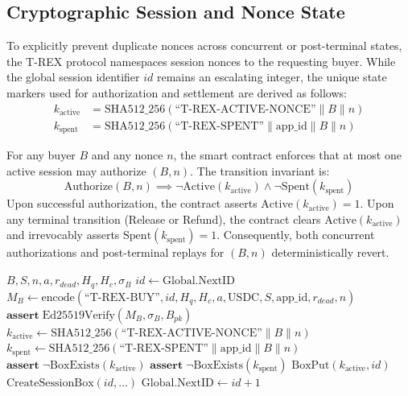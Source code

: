 
\subsection{Cryptographic Session and Nonce State}
To explicitly prevent duplicate nonces across concurrent or post-terminal states, the T-REX protocol namespaces session nonces to the requesting buyer. While the global session identifier $id$ remains an escalating integer, the unique state markers used for authorization and settlement are derived as follows:
\begin{align}
k_{\text{active}} &= \mathrm{SHA512\_256}(\text{``T-REX-ACTIVE-NONCE''} \parallel B \parallel n) \\
k_{\text{spent}} &= \mathrm{SHA512\_256}(\text{``T-REX-SPENT''} \parallel \text{app\_id} \parallel B \parallel n)
\end{align}

\begin{theorem}
For any buyer $B$ and any nonce $n$, the smart contract enforces that at most one active session may authorize $(B, n)$. The transition invariant is:
\[
\mathrm{Authorize}(B, n) \implies \neg \mathrm{Active}(k_{\text{active}}) \land \neg \mathrm{Spent}(k_{\text{spent}})
\]
Upon successful authorization, the contract asserts $\mathrm{Active}(k_{\text{active}}) = 1$. Upon any terminal transition (Release or Refund), the contract clears $\mathrm{Active}(k_{\text{active}})$ and irrevocably asserts $\mathrm{Spent}(k_{\text{spent}}) = 1$. Consequently, both concurrent authorizations and post-terminal replays for $(B, n)$ deterministically revert.
\end{theorem}

\begin{algorithm}[h]
\caption{T-REX Nonce-Enforced Authorization}
\label{alg:authorize}
\begin{algorithmic}[1]
\Require $B, S, n, a, r_{dead}, H_q, H_c, \sigma_B$
\State $id \gets \mathrm{Global.NextID}$
\State $M_B \gets \mathrm{encode}(\text{``T-REX-BUY''}, id, H_q, H_c, a, \text{USDC}, S, \text{app\_id}, r_{dead}, n)$
\State $\mathbf{assert}\; \mathrm{Ed25519Verify}(M_B, \sigma_B, B_{pk})$
\State $k_{\text{active}} \gets \mathrm{SHA512\_256}(\text{``T-REX-ACTIVE-NONCE''} \parallel B \parallel n)$
\State $k_{\text{spent}} \gets \mathrm{SHA512\_256}(\text{``T-REX-SPENT''} \parallel \text{app\_id} \parallel B \parallel n)$
\State $\mathbf{assert}\; \neg \mathrm{BoxExists}(k_{\text{active}})$ 
\State $\mathbf{assert}\; \neg \mathrm{BoxExists}(k_{\text{spent}})$ 
\State $\mathrm{BoxPut}(k_{\text{active}}, id)$
\State $\mathrm{CreateSessionBox}(id, \dots)$
\State $\mathrm{Global.NextID} \gets id + 1$
\end{algorithmic}
\end{algorithm}
